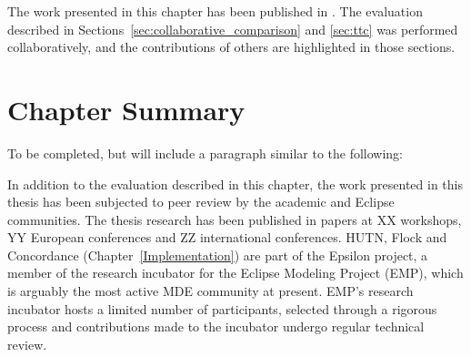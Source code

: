 The work presented in this chapter has been published in \cite{rose10comparison,rose10ttc_solution,rose10ttc_case}. The evaluation described in Sections~\ref{sec:collaborative_comparison} and \ref{sec:ttc} was performed collaboratively, and the contributions of others are highlighted in those sections.








\section{Chapter Summary}
To be completed, but will include a paragraph similar to the following:

In addition to the evaluation described in this chapter, the work presented in this thesis has been subjected to peer review by the academic and Eclipse communities. The thesis research has been published in papers at XX workshops, YY European conferences and ZZ international conferences. HUTN, Flock and Concordance (Chapter~\ref{Implementation}) are part of the Epsilon project, a member of the research incubator for the Eclipse Modeling Project (EMP), which is arguably the most active MDE community at present. EMP's research incubator hosts a limited number of participants, selected through a rigorous process and contributions made to the incubator undergo regular technical review.